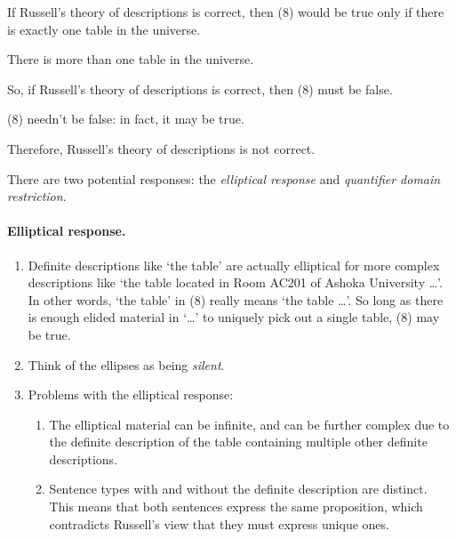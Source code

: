 \begin{argument}\leavevmode
\begin{premises}
  \item[P1)] If Russell's theory of descriptions is correct, then (8) would be true only if there is exactly one table in the universe.
  \item[P2)] There is more than one table in the universe.
  \item[C1)] So, if Russell's theory of descriptions is correct, then (8) must be false.
  \item[P3)] (8) needn't be false: in fact, it may be true.
  \item[C2)] Therefore, Russell's theory of descriptions is not correct.
\end{premises}
\end{argument}

There are two potential responses: the \emph{elliptical response} and \emph{quantifier domain restriction}.

\paragraph{Elliptical response.}
\begin{enumerate}
  \item Definite descriptions like `the table' are actually elliptical for more complex descriptions like `the table located in Room AC201 of Ashoka University \ldots'. In other words, `the table' in (8) really means `the table \ldots'. So long as there is enough elided material in `\ldots' to uniquely pick out a single table, (8) may be true.
  \item Think of the ellipses as being \emph{silent}.
  \item Problems with the elliptical response:
  \begin{enumerate}[label=(\alph*)]
    \item The elliptical material can be infinite, and can be further complex due to the definite description of the table containing multiple other definite descriptions.
    \item Sentence types with and without the definite description are distinct. This means that both sentences express the same proposition, which contradicts Russell's view that they must express unique ones.
  \end{enumerate}
\end{enumerate}

